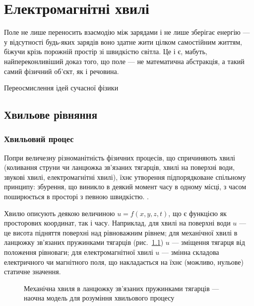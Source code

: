 
\chapter{Електромагнітні хвилі}\label{\currfilebase}
\graphicspath{{\currfilebase/Pictures}}
\epigraph{Поле не лише переносить взаємодію між зарядами і не лише зберігає енергію --- у відсутності будь-яких зарядів воно здатне жити
	цілком самостійним життям, біжучи крізь порожній простір зі швидкістю світла. Це і є, мабуть, найпереконливіший доказ того, що поле --- не
	математична абстракція, а такий самий фізичний об'єкт, як і речовина.
}{Переосмислення ідей сучасної фізики}

\section{Хвильове рівняння}

\subsection*{Хвильовий процес}

Попри величезну різноманітність фізичних процесів, що спричиняють хвилі (коливання струни чи ланцюжка зв'язаних тягарців, хвилі на поверхні
води, звукові хвилі, електромагнітні хвилі), їхнє утворення підпорядковане спільному принципу: збурення, що виникло в деякий момент часу в
одному місці, з часом поширюється в просторі з певною швидкістю. .

Хвилю описують деякою величиною $u = f(x,y,z,t)$, що є функцією як просторових координат, так і часу. Наприклад, для хвилі на поверхні води $u$
--- це висота підняття поверхні над рівноважним рівнем; для механічної хвилі в ланцюжку зв'язаних пружинками тягарців (рис.~\ref{pic:Chain}) $u$
--- зміщення тягарця від положення рівноваги; для електромагнітної хвилі $u$ --- змінна складова електричного чи магнітного поля, що
накладається на їхнє (можливо, нульове) статичне значення.

\begin{figure}[h!]\centering
	\caption{Механічна хвиля в ланцюжку зв'язаних пружинками тягарців --- наочна модель для
		розуміння хвильового процесу\label{pic:Chain}}
\end{figure}

